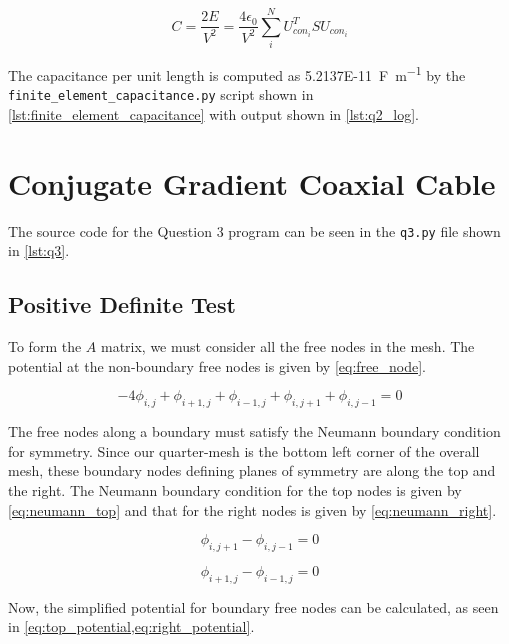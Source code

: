 \documentclass[a4paper,titlepage]{article}
\begin{document}
	\begin{equation} \label{eq:capacitance}
		C = \frac{2E}{V^2} = \frac{4 \epsilon_0}{V^2} \sum_{i}^{N}{U_{con_i}^T S U_{con_i}}
	\end{equation}
	
	The capacitance per unit length is computed as \SI{5.2137E-11}{\farad\per\meter} by the \texttt{finite_element_capacitance.py} script shown in \cref{lst:finite_element_capacitance} with output shown in \cref{lst:q2_log}.
	
	\section{Conjugate Gradient Coaxial Cable}
	
	The source code for the Question 3 program can be seen in the \texttt{q3.py} file shown in \cref{lst:q3}.
	
	\subsection{Positive Definite Test}
	
	To form the $A$ matrix, we must consider all the free nodes in the mesh. The potential at the non-boundary free nodes is given by \cref{eq:free_node}.
	
	\begin{equation} \label{eq:free_node}
		-4\phi_{i, j} + \phi_{i + 1, j}  + \phi_{i - 1, j}  + \phi_{i, j + 1}  + \phi_{i, j - 1} = 0
	\end{equation}
	
	The free nodes along a boundary must satisfy the Neumann boundary condition for symmetry. Since our quarter-mesh is the bottom left corner of the overall mesh, these boundary nodes defining planes of symmetry are along the top and the right. The Neumann boundary condition for the top nodes is given by \cref{eq:neumann_top} and that for the right nodes is given by \cref{eq:neumann_right}.

	\begin{equation} \label{eq:neumann_top}
		\phi_{i, j + 1} - \phi_{i, j - 1} = 0
	\end{equation}
	
	\begin{equation} \label{eq:neumann_right}
		\phi_{i + 1, j} - \phi_{i - 1, j} = 0
	\end{equation}
	
	Now, the simplified potential for boundary free nodes can be calculated, as seen in \cref{eq:top_potential,eq:right_potential}.
	
\end{document}
